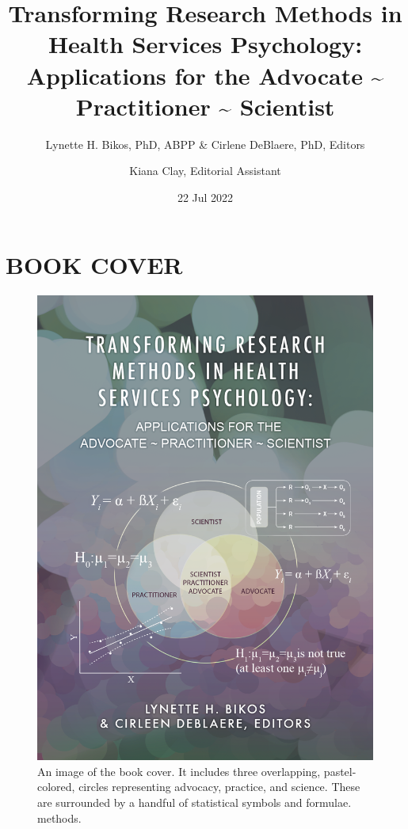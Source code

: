 \documentclass[
  11pt,
]{book}
\title{Transforming Research Methods in Health Services Psychology: Applications for the Advocate \textasciitilde{} Practitioner \textasciitilde{} Scientist}
\author{Lynette H. Bikos, PhD, ABPP \& Cirlene DeBlaere, PhD, Editors \and Kiana Clay, Editorial Assistant}
\date{22 Jul 2022}
\begin{document}
\maketitle

{
\hypersetup{linkcolor=}
\setcounter{tocdepth}{3}
\tableofcontents
}
\hypertarget{book-cover}{%
\chapter*{BOOK COVER}\label{book-cover}}

\begin{figure}
\centering
\includegraphics{images/bookcover.png}
\caption{An image of the book cover. It includes three overlapping, pastel-colored, circles representing advocacy, practice, and science. These are surrounded by a handful of statistical symbols and formulae. methods.}
\end{figure}
\end{document}
